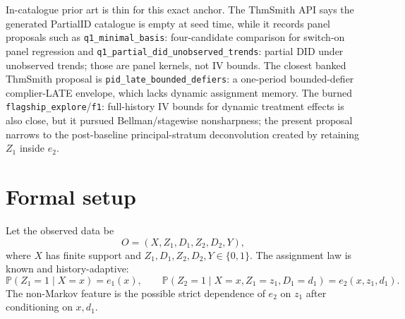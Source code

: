 \documentclass[11pt]{article}
\renewcommand{\Pr}{\mathbb{P}}
\theoremstyle{definition}
\theoremstyle{plain}
\theoremstyle{remark}
\begin{document}
In-catalogue prior art is thin for this exact anchor.  The ThmSmith API says the generated PartialID catalogue is empty at seed time, while it records panel proposals such as \texttt{q1\_minimal\_basis}: four-candidate comparison for switch-on panel regression and \texttt{q1\_partial\_did\_unobserved\_trends}: partial DID under unobserved trends; those are panel kernels, not IV bounds.  The closest banked ThmSmith proposal is \texttt{pid\_late\_bounded\_defiers}: a one-period bounded-defier complier-LATE envelope, which lacks dynamic assignment memory.  The burned \texttt{flagship\_explore}/\texttt{f1}: full-history IV bounds for dynamic treatment effects is also close, but it pursued Bellman/stagewise nonsharpness; the present proposal narrows to the post-baseline principal-stratum deconvolution created by retaining \(Z_1\) inside \(e_2\).

\section{Formal setup}
Let the observed data be
\[
O=(X,Z_1,D_1,Z_2,D_2,Y),
\]
where \(X\) has finite support and \(Z_1,D_1,Z_2,D_2,Y\in\{0,1\}\).  The assignment law is known and history-adaptive:
\[
\Pr(Z_1=1\mid X=x)=e_1(x),\qquad
\Pr(Z_2=1\mid X=x,Z_1=z_1,D_1=d_1)=e_2(x,z_1,d_1).
\]
The non-Markov feature is the possible strict dependence of \(e_2\) on \(z_1\) after conditioning on \(x,d_1\).
\end{document}
